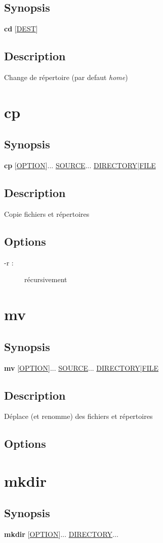 \documentclass[a4paper, 10pt, onecolumn, openright, oneside]{book}
\begin{document}
\subsection{Synopsis}
\textbf{cd} [\ul{DEST}]
\subsection{Description}
Change de répertoire (par defaut \emph{home})

\section{cp}
\subsection{Synopsis}
\textbf{cp} [\ul{OPTION}]... \ul{SOURCE}... \ul{DIRECTORY}|\ul{FILE}
\subsection{Description}
Copie fichiers et répertoires
\subsection{Options}
\begin{description}
\item[-r :] récursivement
\end{description}

\section{mv}
\subsection{Synopsis}
\textbf{mv} [\ul{OPTION}]... \ul{SOURCE}... \ul{DIRECTORY}|\ul{FILE}
\subsection{Description}
Déplace (et renomme) des fichiers et répertoires
\subsection{Options}

\section{mkdir}
\subsection{Synopsis}
\textbf{mkdir} [\ul{OPTION}]... \ul{DIRECTORY}...
\end{document}
